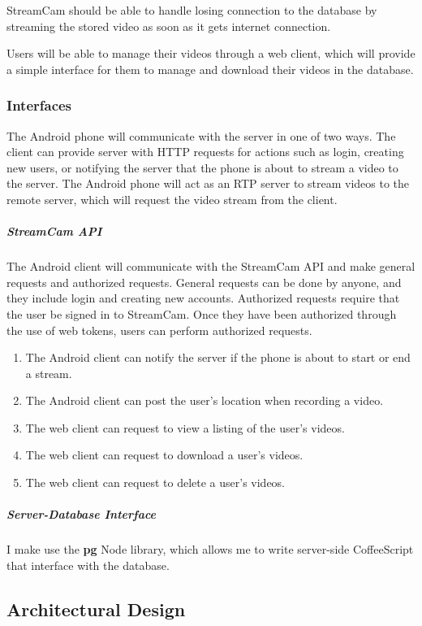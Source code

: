 \documentclass[11pt,a4paper,titlepage]{article}
\begin{document}
StreamCam should be able to handle losing connection to the database by streaming the stored video as soon as it gets internet connection. 

Users will be able to manage their videos through a web client, which will provide a simple interface for them to manage and download their videos in the database. 

\subsubsection{Interfaces}

The Android phone will communicate with the server in one of two ways. The client can provide server with HTTP requests for actions such as login, creating new users, or notifying the server that the phone is about to stream a video to the server. The Android phone will act as an RTP server to stream videos to the  remote server, which will request the video stream from the client. 

\subparagraph{StreamCam API\\}

The Android client will communicate with the StreamCam API and make general requests and authorized requests. General requests can be done by anyone, and they include login and creating new accounts. Authorized requests require that the user be signed in to StreamCam. Once they have been authorized through the use of web tokens, users can perform authorized requests. 
\begin{enumerate}
  \item The Android client can notify the server if the phone is about to start or end a stream.
  \item The Android client can post the user's location when recording a video. 
  \item The web client can request to view a listing of the user's videos.
  \item The web client can request to download a user's videos.
  \item The web client can request to delete a user's videos.
\end{enumerate}

\subparagraph{Server-Database Interface\\}

I make use the \textbf{pg} Node library, which allows me to write server-side CoffeeScript that interface with the database. 

\subsection{Architectural Design}
\end{document}
